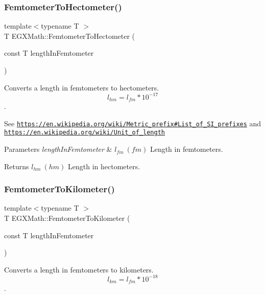 \subsubsection{\texorpdfstring{Femtometer\+To\+Hectometer()}{FemtometerToHectometer()}}
{\footnotesize\ttfamily template$<$typename T $>$ \\
T E\+G\+X\+Math\+::\+Femtometer\+To\+Hectometer (\begin{DoxyParamCaption}\item[{const T}]{length\+In\+Femtometer }\end{DoxyParamCaption})}



Converts a length in femtometers to hectometers. \[ l_{hm}=l_{fm} * 10^{-17} \]. 

See \href{https://en.wikipedia.org/wiki/Metric_prefix#List_of_SI_prefixes}{\tt https\+://en.\+wikipedia.\+org/wiki/\+Metric\+\_\+prefix\#\+List\+\_\+of\+\_\+\+S\+I\+\_\+prefixes} and \href{https://en.wikipedia.org/wiki/Unit_of_length}{\tt https\+://en.\+wikipedia.\+org/wiki/\+Unit\+\_\+of\+\_\+length} 
\begin{DoxyParams}{Parameters}
{\em length\+In\+Femtometer} & $ l_{fm}\ (fm)$ Length in femtometers. \\
\hline
\end{DoxyParams}
\begin{DoxyReturn}{Returns}
$ l_{hm}\ (hm)$ Length in hectometers. 
\end{DoxyReturn}
\mbox{\label{group___e_g_x_math-_conversions-_length_conversions-_s_i-_femtometer-_s_i_ga539d33a130ba1069fe9dfaea944cd4ed}} 
\subsubsection{\texorpdfstring{Femtometer\+To\+Kilometer()}{FemtometerToKilometer()}}
{\footnotesize\ttfamily template$<$typename T $>$ \\
T E\+G\+X\+Math\+::\+Femtometer\+To\+Kilometer (\begin{DoxyParamCaption}\item[{const T}]{length\+In\+Femtometer }\end{DoxyParamCaption})}



Converts a length in femtometers to kilometers. \[ l_{km}=l_{fm} * 10^{-18} \]. 

